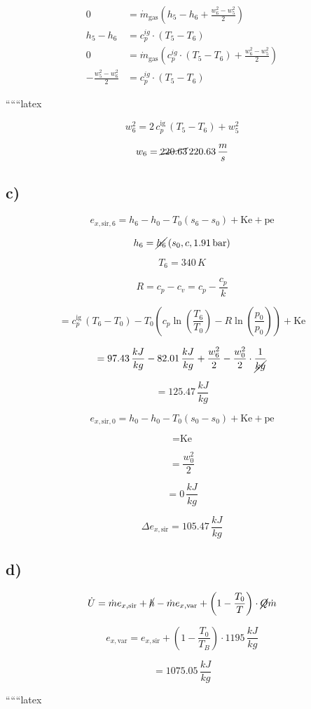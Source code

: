 \begin{align*}
    0 &= \dot{m}_{\text{gas}} \left( h_5 - h_6 + \frac{w_6^2 - w_5^2}{2} \right) \\
    h_5 - h_6 &= c_p^{ig} \cdot (T_5 - T_6) \\
    0 &= \dot{m}_{\text{gas}} \left( c_p^{ig} \cdot (T_5 - T_6) + \frac{w_6^2 - w_5^2}{2} \right) \\
    -\frac{w_5^2 - w_6^2}{2} &= c_p^{ig} \cdot (T_5 - T_6)
\end{align*}

``````latex

\[
w_{6}^2 = 2 \, c_p^{\text{ig}} \, \left( T_5 - T_6 \right) + w_{5}^2
\]

\[
w_6 = \cancel{220.63} \, 220.63 \, \frac{m}{s}
\]

\subsection*{c)}

\[
e_{x,\text{sir},6} = h_6 - h_0 - T_0 (s_6 - s_0) + \text{Ke} + \text{pe}
\]

\[
h_6 = \cancel{h_6} \, (s_0, c, 1.91 \, \text{bar})
\]

\[
T_6 = 340 \, K
\]

\[
R = c_p - c_v = c_p - \frac{c_p}{k}
\]

\[
= c_p^{\text{ig}} \, (T_6 - T_0) - T_0 \left( c_p \ln \left( \frac{T_6}{T_0} \right) - R \ln \left( \frac{p_0}{p_0} \right) \right) + \text{Ke}
\]

\[
= 97.43 \, \frac{kJ}{kg} - 82.01 \, \frac{kJ}{kg} + \frac{w_6^2}{2} - \frac{w_0^2}{2} \cdot \frac{1}{\cancel{kg}}
\]

\[
= 125.47 \, \frac{kJ}{kg}
\]

\[
e_{x,\text{sir},0} = h_0 - h_0 - T_0 (s_0 - s_0) + \text{Ke} + \text{pe}
\]

\[
= \text{Ke}
\]

\[
= \frac{w_0^2}{2}
\]

\[
= 0 \, \frac{kJ}{kg}
\]

\[
\Delta e_{x,\text{sir}} = 105.47 \, \frac{kJ}{kg}
\]

\subsection*{d)}

\[
\dot{U} = \dot{m} e_{x,\text{sir}} + \cancel{h} - \dot{m} e_{x,\text{var}} + \left( 1 - \frac{T_0}{T} \right) \cdot \cancel{Q} \dot{m}
\]

\[
e_{x,\text{var}} = e_{x,\text{sir}} + \left( 1 - \frac{T_0}{T_B} \right) \cdot 1195 \, \frac{kJ}{kg}
\]

\[
= 1075.05 \, \frac{kJ}{kg}
\]

``````latex


